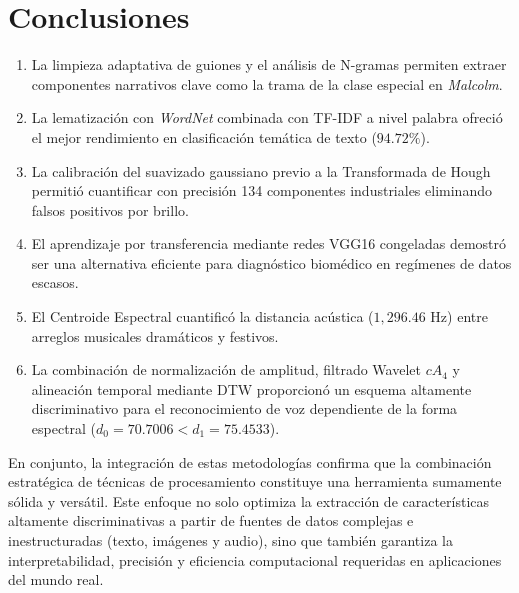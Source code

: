 \documentclass[12pt]{article}
\begin{document}
\section{Conclusiones}
\begin{enumerate}
    \item La limpieza adaptativa de guiones y el análisis de N-gramas permiten extraer componentes narrativos clave como la trama de la clase especial en \textit{Malcolm}.
    \item La lematización con \textit{WordNet} combinada con TF-IDF a nivel palabra ofreció el mejor rendimiento en clasificación temática de texto ($94.72\%$).
    \item La calibración del suavizado gaussiano previo a la Transformada de Hough permitió cuantificar con precisión 134 componentes industriales eliminando falsos positivos por brillo.
    \item El aprendizaje por transferencia mediante redes VGG16 congeladas demostró ser una alternativa eficiente para diagnóstico biomédico en regímenes de datos escasos.
    \item El Centroide Espectral cuantificó la distancia acústica ($1,296.46\text{ Hz}$) entre arreglos musicales dramáticos y festivos.
    \item La combinación de normalización de amplitud, filtrado Wavelet $cA_4$ y alineación temporal mediante DTW proporcionó un esquema altamente discriminativo para el reconocimiento de voz dependiente de la forma espectral ($d_{\text{$0$}} = 70.7006 < d_{\text{$1$}} = 75.4533$).
\end{enumerate}

En conjunto, la integración de estas metodologías confirma que la combinación estratégica de técnicas de procesamiento constituye una herramienta sumamente sólida y versátil. Este enfoque no solo optimiza la extracción de características altamente discriminativas a partir de fuentes de datos complejas e inestructuradas (texto, imágenes y audio), sino que también garantiza la interpretabilidad, precisión y eficiencia computacional requeridas en aplicaciones del mundo real.

\clearpage
\nocite{*}
 

\end{document}
